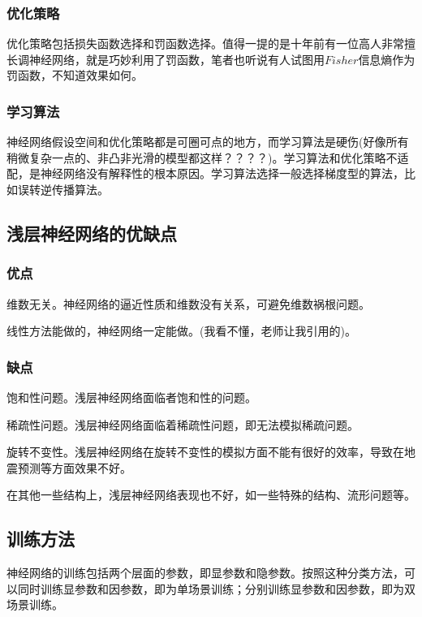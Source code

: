 \documentclass[10pt, a4paper]{article}
\begin{document}
\subsubsection{优化策略}

优化策略包括损失函数选择和罚函数选择。值得一提的是十年前有一位高人非常擅长调神经网络，就是巧妙利用了罚函数，笔者也听说有人试图用$Fisher$信息熵作为罚函数，不知道效果如何。

\subsubsection{学习算法}

神经网络假设空间和优化策略都是可圈可点的地方，而学习算法是硬伤(好像所有稍微复杂一点的、非凸非光滑的模型都这样？？？？)。学习算法和优化策略不适配，是神经网络没有解释性的根本原因。学习算法选择一般选择梯度型的算法，比如误转逆传播算法。
\subsection{浅层神经网络的优缺点}
\subsubsection{优点}

维数无关\cite{barron1993universal}。神经网络的逼近性质和维数没有关系，可避免维数祸根问题。

线性方法能做的，神经网络一定能做。\cite{mhaskar1996neural}(我看不懂，老师让我引用的)。

\subsubsection{缺点}

饱和性问题\cite{debao1993degree}。浅层神经网络面临者饱和性的问题。

稀疏性问题\cite{chui1994neural}。浅层神经网络面临着稀疏性问题，即无法模拟稀疏问题。

旋转不变性。浅层神经网络在旋转不变性的模拟方面不能有很好的效率，导致在地震预测等方面效果不好。

在其他一些结构上，浅层神经网络表现也不好，如一些特殊的结构、流形问题等。

\subsection{训练方法}

神经网络的训练包括两个层面的参数，即显参数和隐参数。按照这种分类方法，可以同时训练显参数和因参数，即为单场景训练；分别训练显参数和因参数，即为双场景训练。
\end{document}
